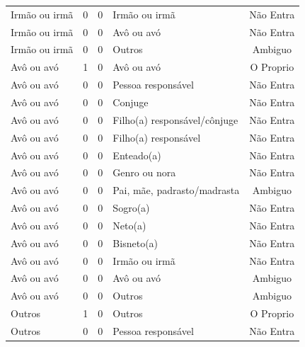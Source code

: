 \documentclass[
	12pt,				%
	openright,			%
	twoside,			%
	a4paper,			%
	english,			%
	french,				%
	spanish,			%
	brazil				%
	]{abntex2}
\begin{document}
\begin{anexosenv}
\begin{longtable}{@{}lcclc@{}}
Irmão ou irmã                & 0         & 0        & Irmão ou irmã                & Não Entra       \\
Irmão ou irmã                & 0         & 0        & Avô ou avó                   & Não Entra       \\
Irmão ou irmã                & 0         & 0        & Outros                       & Ambiguo         \\
Avô ou avó                   & 1         & 0        & Avô ou avó                   & O Proprio       \\
Avô ou avó                   & 0         & 0        & Pessoa responsável           & Não Entra       \\
Avô ou avó                   & 0         & 0        & Conjuge                      & Não Entra       \\
Avô ou avó                   & 0         & 0        & Filho(a) responsável/cônjuge & Não Entra       \\
Avô ou avó                   & 0         & 0        & Filho(a) responsável         & Não Entra       \\
Avô ou avó                   & 0         & 0        & Enteado(a)                   & Não Entra       \\
Avô ou avó                   & 0         & 0        & Genro ou nora                & Não Entra       \\
Avô ou avó                   & 0         & 0        & Pai, mãe, padrasto/madrasta  & Ambiguo         \\
Avô ou avó                   & 0         & 0        & Sogro(a)                     & Não Entra       \\
Avô ou avó                   & 0         & 0        & Neto(a)                      & Não Entra       \\
Avô ou avó                   & 0         & 0        & Bisneto(a)                   & Não Entra       \\
Avô ou avó                   & 0         & 0        & Irmão ou irmã                & Não Entra       \\
Avô ou avó                   & 0         & 0        & Avô ou avó                   & Ambiguo         \\
Avô ou avó                   & 0         & 0        & Outros                       & Ambiguo         \\
Outros                       & 1         & 0        & Outros                       & O Proprio       \\
Outros                       & 0         & 0        & Pessoa responsável           & Não Entra       \\

\end{longtable}
\end{anexosenv}
\end{document}
